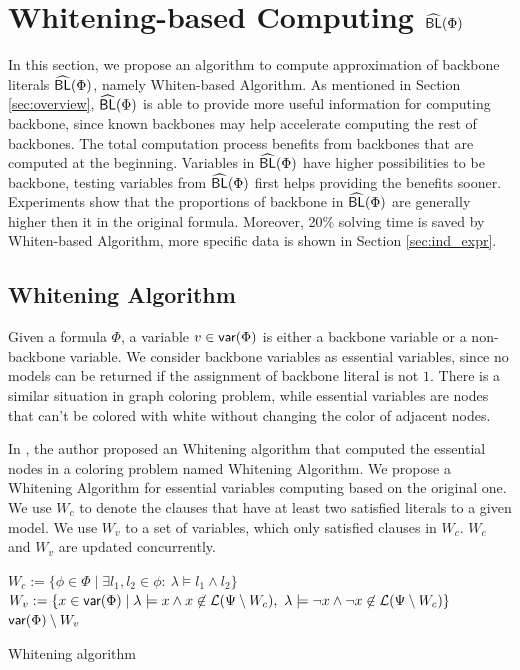 \section{Whitening-based Computing ${\sf \widehat{BL}}(\Phi)$}

In this section, we propose an algorithm to compute approximation of backbone literals ${\sf \widehat{BL}}(\Phi)$, namely Whiten-based Algorithm. As mentioned in Section \ref{sec:overview}, ${\sf \widehat{BL}}(\Phi)$ is able to provide more useful information for computing backbone, since known backbones may help accelerate computing the rest of backbones. The total computation process benefits from backbones that are computed at the beginning. Variables in ${\sf \widehat{BL}}(\Phi)$ have higher possibilities to be backbone, testing variables from ${\sf \widehat{BL}}(\Phi)$ first helps providing the benefits sooner. Experiments show that the proportions of backbone in ${\sf \widehat{BL}}(\Phi)$ are generally higher then it in the original formula. Moreover, 20\% solving time is saved by Whiten-based Algorithm, more specific data is shown in Section \ref{sec:ind_expr}.

\subsection{Whitening Algorithm}

Given a formula $\Phi$, a variable $v\in\textsf{var}(\Phi)$ is either a backbone variable or a non-backbone variable. We consider backbone variables as essential variables, since no models can be returned if the assignment of backbone literal is not $1$. There is a similar situation in graph coloring problem, while essential variables are nodes that can't be colored with white without changing the color of adjacent nodes.

In \cite{Par03}, the author proposed an Whitening algorithm that computed the essential nodes in a coloring problem named Whitening Algorithm. We propose a Whitening Algorithm for essential variables computing based on the original one. We use $W_c$ to denote the clauses that have at least two satisfied literals to a given model. We use $W_v$ to a set of variables, which only satisfied clauses in $W_c$. $W_c$ and $W_v$ are updated concurrently.

\begin{algorithm2e}
\SetAlgoShortEnd
\SetFillComment
{}
$W_c:= \{\phi\in\Phi \mid \exists l_1,l_2\in\phi: \  \lambda\models l_1\wedge l_2\}$\; \label{alg2:c}
$W_v:=\{x\in \var(\Phi)\mid \lambda\models x\wedge x\not\in \Lit(\Psi\setminus W_c),
        \ \lambda\models \neg x\wedge \neg x\not\in \Lit(\Psi\setminus W_c)\}$\; \label{alg2:v}
\Return $\textsf{var}(\Phi)\setminus W_v$\;
\caption{Whitening algorithm}
\label{alg:whitening}
\end{algorithm2e}

